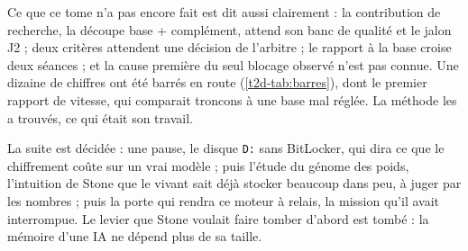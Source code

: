 Ce que ce tome n'a pas encore fait est dit aussi clairement : la contribution de recherche, la découpe base + complément, attend son banc de qualité et le jalon J2 ; deux critères attendent une décision de l'arbitre ; le rapport à la base croise deux séances ; et la cause première du seul blocage observé n'est pas connue. Une dizaine de chiffres ont été barrés en route (\cref{t2d-tab:barres}), dont le premier rapport de vitesse, qui comparait troncons à une base mal réglée. La méthode les a trouvés, ce qui était son travail.

La suite est décidée : une pause, le disque \texttt{D:} sans BitLocker, qui dira ce que le chiffrement coûte sur un vrai modèle ; puis l'étude du génome des poids, l'intuition de Stone que le vivant sait déjà stocker beaucoup dans peu, à juger par les nombres ; puis la porte qui rendra ce moteur à relais, la mission qu'il avait interrompue. Le levier que Stone voulait faire tomber d'abord est tombé : la mémoire d'une IA ne dépend plus de sa taille.
